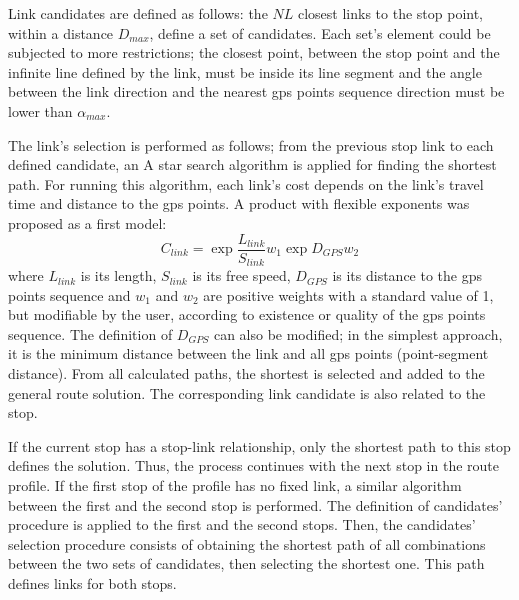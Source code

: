 Link candidates are defined as follows: the $NL$ closest links to the stop point, within a distance $D_{max}$, define a set of candidates. Each set's element could be subjected to more restrictions; the closest point, between the stop point and the infinite line defined by the link, must be inside its line segment and the angle between the link direction and the nearest \gls{gps} points sequence direction must be lower than $\alpha_{max}$.

The link's selection is performed as follows; from the previous stop link to each defined candidate, an A star search algorithm is applied for finding the shortest path. For running this algorithm, each link's cost depends on the link's travel time and distance to the \gls{gps} points. A product with flexible exponents was proposed as a first model:
%
\begin{equation}
\label{eq:LinkCost}
	C_{link} = \exp{\frac{L_{link}}{S_{link}}}{w_{1}}\exp{D_{GPS}}{w_{2}}
\end{equation}
%
where $L_{link}$ is its length, $S_{link}$ is its free speed, $D_{GPS}$ is its distance to the \gls{gps} points sequence and $w_{1}$ and $w_{2}$ are positive weights with a standard value of 1, but modifiable by the user, according to existence or quality of the \gls{gps} points sequence. The definition of $D_{GPS}$ can also be modified; in the simplest approach, it is the minimum distance between the link and all \gls{gps} points (point-segment distance). From all calculated paths, the shortest is selected and added to the general route solution. The corresponding link candidate is also related to the stop. 

If the current stop has a stop-link relationship, only the shortest path to this stop defines the solution. Thus, the process continues with the next stop in the route profile. If the first stop of the profile has no fixed link, a similar algorithm between the first and the second stop is performed. The definition of candidates' procedure is applied to the first and the second stops. Then, the candidates' selection procedure consists of obtaining the shortest path of all combinations between the two sets of candidates, then selecting the shortest one. This path defines links for both stops.


